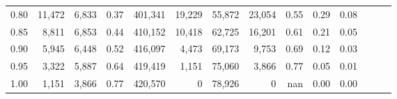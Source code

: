 \begin{tabular}{rrrrrrrrrrrrrr}
0.80 &  11,472 &  6,833 &  0.37 &  401,341 &   19,229 &  55,872 &  23,054 &  0.55 &  0.29 &      0.08 \\
0.85 &   8,811 &  6,853 &  0.44 &  410,152 &   10,418 &  62,725 &  16,201 &  0.61 &  0.21 &      0.05 \\
0.90 &   5,945 &  6,448 &  0.52 &  416,097 &    4,473 &  69,173 &   9,753 &  0.69 &  0.12 &      0.03 \\
0.95 &   3,322 &  5,887 &  0.64 &  419,419 &    1,151 &  75,060 &   3,866 &  0.77 &  0.05 &      0.01 \\
1.00 &   1,151 &  3,866 &  0.77 &  420,570 &        0 &  78,926 &       0 &   nan &  0.00 &      0.00 \\
\bottomrule
\end{tabular}
